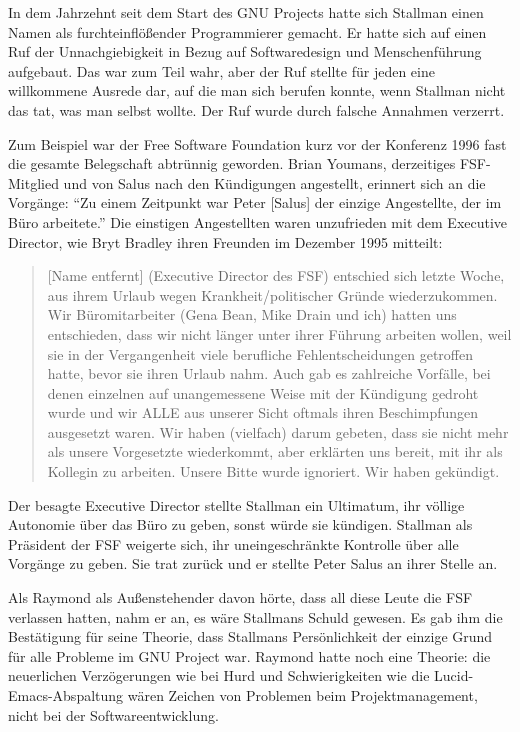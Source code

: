 In dem Jahrzehnt seit dem Start des GNU Projects hatte sich Stallman einen Namen als furchteinflößender Programmierer gemacht. Er hatte sich auf einen Ruf der Unnachgiebigkeit in Bezug auf Softwaredesign und Menschenführung aufgebaut. Das war zum Teil wahr, aber der Ruf stellte für jeden eine willkommene Ausrede dar, auf die man sich berufen konnte, wenn Stallman nicht das tat, was man selbst wollte. Der Ruf wurde durch falsche Annahmen verzerrt.

Zum Beispiel war der Free Software Foundation kurz vor der Konferenz 1996 fast die gesamte Belegschaft abtrünnig geworden. Brian Youmans, derzeitiges FSF-Mitglied und von Salus nach den Kündigungen angestellt, erinnert sich an die Vorgänge: "`Zu einem Zeitpunkt war Peter [Salus] der einzige Angestellte, der im Büro arbeitete."' Die einstigen Angestellten waren unzufrieden mit dem Executive Director, wie Bryt Bradley ihren Freunden im Dezember 1995 mitteilt:

\begin{quote}
[Name entfernt] (Executive Director des FSF) entschied sich letzte Woche, aus ihrem Urlaub wegen Krankheit/politischer Gründe wiederzukommen. Wir Büromitarbeiter (Gena Bean, Mike Drain und ich) hatten uns entschieden, dass wir nicht länger unter ihrer Führung arbeiten wollen, weil sie in der Vergangenheit viele berufliche Fehlentscheidungen getroffen hatte, bevor sie ihren Urlaub nahm. Auch gab es zahlreiche Vorfälle, bei denen einzelnen auf unangemessene Weise mit der Kündigung gedroht wurde und wir ALLE aus unserer Sicht oftmals ihren Beschimpfungen ausgesetzt waren. Wir haben (vielfach) darum gebeten, dass sie nicht mehr als unsere Vorgesetzte wiederkommt, aber erklärten uns bereit, mit ihr als Kollegin zu arbeiten. Unsere Bitte wurde ignoriert. Wir haben gekündigt.
\end{quote}

Der besagte Executive Director stellte Stallman ein Ultimatum, ihr völlige Autonomie über das Büro zu geben, sonst würde sie kündigen. Stallman als Präsident der FSF weigerte sich, ihr uneingeschränkte Kontrolle über alle Vorgänge zu geben. Sie trat zurück und er stellte Peter Salus an ihrer Stelle an.

Als Raymond als Außenstehender davon hörte, dass all diese Leute die FSF verlassen hatten, nahm er an, es wäre Stallmans Schuld gewesen. Es gab ihm die Bestätigung für seine Theorie, dass Stallmans Persönlichkeit der einzige Grund für alle Probleme im GNU Project war. Raymond hatte noch eine  Theorie: die neuerlichen Verzögerungen wie bei Hurd und Schwierigkeiten wie die Lucid-Emacs-Abspaltung wären Zeichen von Problemen beim Projektmanagement, nicht bei der Softwareentwicklung.

